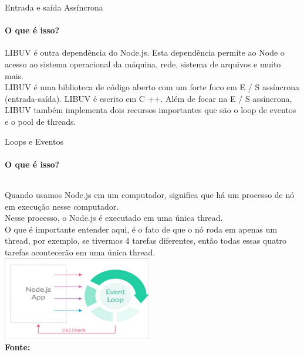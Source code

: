 \documentclass{beamer}
\begin{document}
\begin{frame}{Entrada e saída Assíncrona}
    \framesubtitle{O que é isso?}%
    LIBUV é outra  dependência do Node.js. Esta dependência permite ao Node o acesso ao sistema operacional da máquina, rede, sistema de arquivos e muito mais.\\
          \vspace{0.5cm}
    LIBUV é uma biblioteca de código aberto com um forte foco em E / S assíncrona (entrada-saída). LIBUV é escrito em C ++. Além de focar na E / S assíncrona, LIBUV também implementa dois recursos importantes que são o loop de eventos e o pool de threads.          
\end{frame}
\begin{frame}{Loops e Eventos}
    \framesubtitle{O que é isso?}%
    \begin{columns}[onlytextwidth]
    Quando usamos Node.js em um computador, significa que há um processo de nó em execução nesse computador. 
         \\
	Nesse processo, o Node.js é executado em uma única thread. \\
	O que é importante entender aqui, é o fato de que o nó roda em apenas um thread, por exemplo, se tivermos 4 tarefas diferentes, então todas essas quatro tarefas acontecerão em uma única thread.          
    \vspace{0.5cm}
        \includegraphics[width=65mm]{resources/aula1_8.png}\\
        \tiny{\textbf{Fonte:} \cite{ich2021}}
    \end{columns}
\end{frame}
\end{document}

